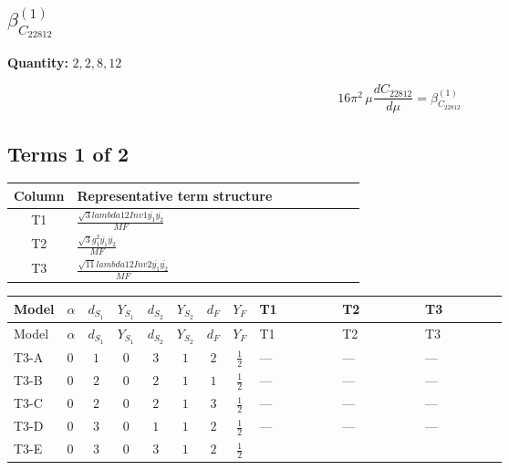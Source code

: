\documentclass[8pt]{article}
\begin{document}
\begin{landscape}
\section*{$\beta_{C_{22812}}^{(1)}$}
\noindent\textbf{Quantity: }$\mathrm{2,2,8,12}$\par\smallskip
\[16\pi^2\,\mu\frac{d C_{22812}}{d\mu}=\beta_{C_{22812}}^{(1)}\]
\subsection*{Terms 1 of 2}
\begin{center}
\begin{tabular}{@{}c >{\raggedright\arraybackslash}p{0.82\linewidth}@{}}
\toprule
Column & Representative term structure \\
\midrule
T1 & \(\displaystyle \frac{\sqrt{3} lambda12Inv1 \overline{y_{1}} \overline{y_{2}}}{MF}\) \\
\midrule
T2 & \(\displaystyle \frac{\sqrt{3} g_{1}^{2} \overline{y_{1}} \overline{y_{2}}}{MF}\) \\
\midrule
T3 & \(\displaystyle \frac{\sqrt{11} lambda12Inv2 \overline{y_{1}} \overline{y_{2}}}{MF}\) \\
\midrule
\bottomrule
\end{tabular}
\end{center}
\smallskip
\tiny
\begin{longtable}{@{}llcccccc >{\raggedright\arraybackslash}p{0.21\linewidth} >{\raggedright\arraybackslash}p{0.21\linewidth} >{\raggedright\arraybackslash}p{0.21\linewidth}@{}}
\toprule
Model & $\alpha$ & $d_{S_1}$ & $Y_{S_1}$ & $d_{S_2}$ & $Y_{S_2}$ & $d_F$ & $Y_F$ & T1 & T2 & T3 \\
\midrule
\endfirsthead
\toprule
Model & $\alpha$ & $d_{S_1}$ & $Y_{S_1}$ & $d_{S_2}$ & $Y_{S_2}$ & $d_F$ & $Y_F$ & T1 & T2 & T3 \\
\midrule
\endhead
T3-A & $0$ & $1$ & $0$ & $3$ & $1$ & $2$ & $\frac{1}{2}$ & --- & --- & --- \\
\midrule
T3-B & $0$ & $2$ & $0$ & $2$ & $1$ & $1$ & $\frac{1}{2}$ & --- & --- & --- \\
\midrule
T3-C & $0$ & $2$ & $0$ & $2$ & $1$ & $3$ & $\frac{1}{2}$ & --- & --- & --- \\
\midrule
T3-D & $0$ & $3$ & $0$ & $1$ & $1$ & $2$ & $\frac{1}{2}$ & --- & --- & --- \\
\midrule
T3-E & $0$ & $3$ & $0$ & $3$ & $1$ & $2$ & $\frac{1}{2}$ & \scriptsize\adjustbox{max width=\linewidth}{$\begin{gathered} - \frac{\sqrt{3} lambda12Inv1 \overline{y_{1}} \overline{y_{2}}}{6 MF}\end{gathered}$} & \scriptsize\adjustbox{max width=\linewidth}{$\begin{gathered} \frac{\sqrt{3} g_{1}^{2} \overline{y_{1}} \overline{y_{2}}}{8 MF}\end{gathered}$} & \scriptsize\adjustbox{max width=\linewidth}{$\begin{gathered} \frac{3 \sqrt{11} lambda12Inv2 \overline{y_{1}} \overline{y_{2}}}{22 MF}\end{gathered}$} \\

\end{longtable}
\end{landscape}
\end{document}
